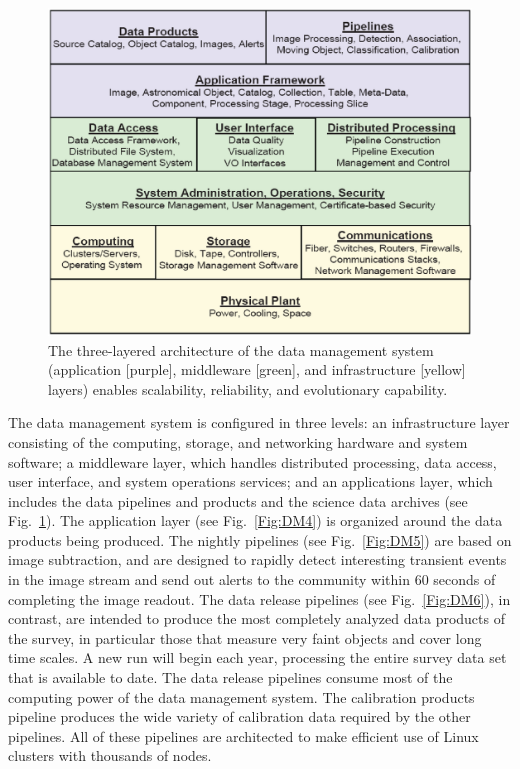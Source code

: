 \documentclass{emulateapj}
\begin{document}
\begin{figure}
\vskip 0.1in
\includegraphics[width=1.0\hsize,clip]{DMsandwich.ps}
\caption{The three-layered architecture of the data management system 
(application [purple], middleware [green], and infrastructure [yellow] layers) 
enables scalability, reliability, and evolutionary capability.} 
\label{Fig:DM1}
\end{figure}

The data management system is configured in three levels: an
infrastructure layer consisting of the computing, storage, and
networking hardware and system software; a middleware layer, which
handles distributed processing, data access, user interface, and
system operations services; and an applications layer, which includes
the data pipelines and products and the science data archives (see
Fig.~\ref{Fig:DM1}). The application layer (see Fig.~\ref{Fig:DM4})
is organized around the data products being produced.  The nightly
pipelines (see Fig.~\ref{Fig:DM5}) are based on image subtraction,
and are designed to rapidly detect interesting transient events in the
image stream and send out alerts to the community within 60 seconds of
completing the image readout.  The data release
pipelines (see Fig.~\ref{Fig:DM6}), in contrast, are intended to
produce the most completely analyzed data products of the survey, in
particular those that measure very faint objects and cover long time
scales. A new run will begin each year, processing the entire survey data
set that is available to date. The data release pipelines consume most of the
computing power of the data management system.  The calibration
products pipeline produces the wide variety of calibration data
required by the other pipelines.  All of these pipelines are
architected to make efficient use of Linux clusters with thousands of
nodes.
\end{document}
